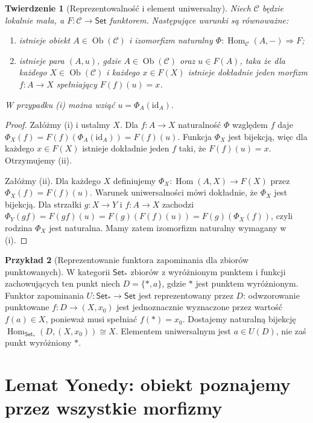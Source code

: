 \documentclass[11pt,a4paper]{article}
\numberwithin{equation}{section}
\theoremstyle{plain}
\newtheorem{twierdzenie}{Twierdzenie}[section]
\theoremstyle{definition}
\newtheorem{przyklad}[twierdzenie]{Przykład}
\theoremstyle{remark}
\newcommand{\cat}[1]{\mathsf{#1}}
\newcommand{\Set}{\cat{Set}}
\newcommand{\id}{\mathrm{id}}
\newcommand{\Hom}{\operatorname{Hom}}
\newcommand{\Ob}{\operatorname{Ob}}
\begin{document}
\begin{twierdzenie}[Reprezentowalność i element uniwersalny]\label{tw:univ-element}
Niech $\mathcal C$ będzie lokalnie mała, a $F:\mathcal C\to\Set$ funktorem. Następujące warunki są równoważne:
\begin{enumerate}[label=(\roman*)]
\item istnieje obiekt $A\in\Ob(\mathcal C)$ i izomorfizm naturalny $\Phi:\Hom_{\mathcal C}(A,-)\Rightarrow F$;
\item istnieje para $(A,u)$, gdzie $A\in\Ob(\mathcal C)$ oraz $u\in F(A)$, taka że dla każdego $X\in\Ob(\mathcal C)$ i każdego $x\in F(X)$ istnieje dokładnie jeden morfizm $f:A\to X$ spełniający $F(f)(u)=x$.
\end{enumerate}
W przypadku (i) można wziąć $u=\Phi_A(\id_A)$.
\end{twierdzenie}
\begin{proof}
Załóżmy (i) i ustalmy $X$. Dla $f:A\to X$ naturalność $\Phi$ względem $f$ daje $\Phi_X(f)=F(f)(\Phi_A(\id_A))=F(f)(u)$. Funkcja $\Phi_X$ jest bijekcją, więc dla każdego $x\in F(X)$ istnieje dokładnie jeden $f$ taki, że $F(f)(u)=x$. Otrzymujemy (ii).

Załóżmy (ii). Dla każdego $X$ definiujemy $\Phi_X:\Hom(A,X)\to F(X)$ przez $\Phi_X(f)=F(f)(u)$. Warunek uniwersalności mówi dokładnie, że $\Phi_X$ jest bijekcją. Dla strzałki $g:X\to Y$ i $f:A\to X$ zachodzi $\Phi_Y(gf)=F(gf)(u)=F(g)(F(f)(u))=F(g)(\Phi_X(f))$, czyli rodzina $\Phi_X$ jest naturalna. Mamy zatem izomorfizm naturalny wymagany w (i).
\end{proof}



\begin{przyklad}[Reprezentowanie funktora zapominania dla zbiorów punktowanych]
W kategorii $\Set_*$ zbiorów z wyróżnionym punktem i funkcji zachowujących ten punkt niech $D=\{*,a\}$, gdzie $*$ jest punktem wyróżnionym. Funktor zapominania $U:\Set_*\to\Set$ jest reprezentowany przez $D$: odwzorowanie punktowane $f:D\to(X,x_0)$ jest jednoznacznie wyznaczone przez wartość $f(a)\in X$, ponieważ musi spełniać $f(*)=x_0$. Dostajemy naturalną bijekcję $\Hom_{\Set_*}(D,(X,x_0))\cong X$. Elementem uniwersalnym jest $a\in U(D)$, nie zaś punkt wyróżniony $*$.
\end{przyklad}

\section{Lemat Yonedy: obiekt poznajemy przez wszystkie morfizmy}\label{sec:yoneda}
\end{document}
